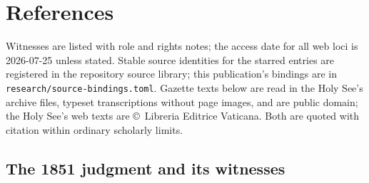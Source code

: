\sectionguard
\section{References}

Witnesses are listed with role and rights notes; the access date for
all web loci is 2026-07-25 unless stated. Stable source identities
for the starred entries are registered in the repository source
library; this publication's bindings are in
\texttt{research/source-bindings.toml}. Gazette texts below are read
in the Holy See's archive files, typeset transcriptions without page
images, and are public domain; the Holy See's web texts are
\copyright\ Libreria Editrice Vaticana. Both are quoted with
citation within ordinary scholarly limits.

\subsection*{The 1851 judgment and its witnesses}


